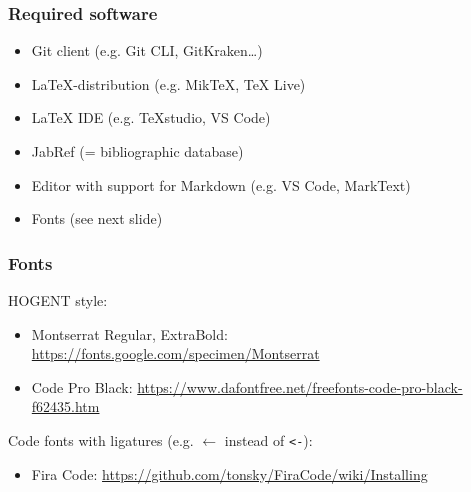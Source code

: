 \documentclass[aspectratio=169]{beamer}
\begin{document}
\begin{frame}
  \frametitle{Required software}

  \begin{itemize}
    \item Git client (e.g. Git CLI, GitKraken\ldots)
    \item \LaTeX-distribution (e.g. MikTeX, TeX Live)
    \item {\LaTeX} IDE (e.g. {\TeX}studio, VS Code)
    \item JabRef (= bibliographic database)
    \item Editor with support for Markdown (e.g. VS Code, MarkText)
    \item Fonts (see next slide)
  \end{itemize}

  \bigskip
\end{frame}

\begin{frame}[fragile]
  \frametitle{Fonts}

  HOGENT style:

  \begin{itemize}
    \item Montserrat Regular, ExtraBold: \url{https://fonts.google.com/specimen/Montserrat}
    \item Code Pro Black: \url{https://www.dafontfree.net/freefonts-code-pro-black-f62435.htm}
  \end{itemize}

  Code fonts with ligatures (e.g. \({\leftarrow}\) instead of \verb|<-|):

  \begin{itemize}
    \item Fira Code: \url{https://github.com/tonsky/FiraCode/wiki/Installing}
  \end{itemize}
\end{frame}
\end{document}
